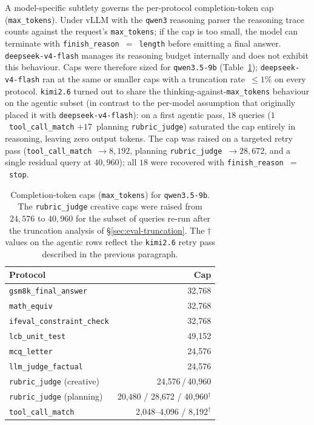 \documentclass[11pt,a4paper]{article}
\begin{document}
A model-specific subtlety governs the per-protocol completion-token cap
(\texttt{max\_tokens}). Under vLLM with the \texttt{qwen3} reasoning parser the
reasoning trace counts against the request's \texttt{max\_tokens}; if the cap is
too small, the model can terminate with \texttt{finish\_reason}~$=$~\texttt{length}
before emitting a final answer. \texttt{deepseek-v4-flash} manages its reasoning
budget internally and does not exhibit this behaviour. Caps were therefore sized
for \texttt{qwen3.5-9b} (Table~\ref{tab:maxtokens}); \texttt{deepseek-v4-flash}
ran at the same or smaller caps with a truncation rate~$\le 1\%$ on every
protocol. \texttt{kimi2.6} turned out to share the
thinking-against-\texttt{max\_tokens} behaviour on the agentic subset (in
contrast to the per-model assumption that originally placed it with
\texttt{deepseek-v4-flash}): on a first agentic pass, $18$ queries
($1$~\texttt{tool\_call\_match} $+ 17$~planning \texttt{rubric\_judge})
saturated the cap entirely in reasoning, leaving zero output tokens. The cap
was raised on a targeted retry pass
(\texttt{tool\_call\_match}~$\to 8{,}192$, planning
\texttt{rubric\_judge}~$\to 28{,}672$, and a single residual query at
$40{,}960$); all $18$ were recovered with
\texttt{finish\_reason}~$=$~\texttt{stop}.

\begin{table}[ht]
\centering
\caption{Completion-token caps (\texttt{max\_tokens}) for \texttt{qwen3.5-9b}.
The \texttt{rubric\_judge} creative caps were raised from $24{,}576$ to $40{,}960$
for the subset of queries re-run after the truncation analysis of
§\ref{sec:eval-truncation}. The $\dagger$ values on the agentic rows reflect the
\texttt{kimi2.6} retry pass described in the previous paragraph.}
\label{tab:maxtokens}
\small
\begin{tabular}{l r}
\toprule
\textbf{Protocol} & \textbf{Cap} \\
\midrule
\texttt{gsm8k\_final\_answer}       & 32{,}768 \\
\texttt{math\_equiv}                & 32{,}768 \\
\texttt{ifeval\_constraint\_check}  & 32{,}768 \\
\texttt{lcb\_unit\_test}            & 49{,}152 \\
\texttt{mcq\_letter}                & 24{,}576 \\
\texttt{llm\_judge\_factual}        & 24{,}576 \\
\texttt{rubric\_judge} (creative)   & 24{,}576\,/\,40{,}960 \\
\texttt{rubric\_judge} (planning)   & 20{,}480 / 28{,}672 / 40{,}960$^{\dagger}$ \\
\texttt{tool\_call\_match}          & \phantom{0}2{,}048--4{,}096 / 8{,}192$^{\dagger}$ \\
\bottomrule
\end{tabular}
\end{table}
\end{document}

